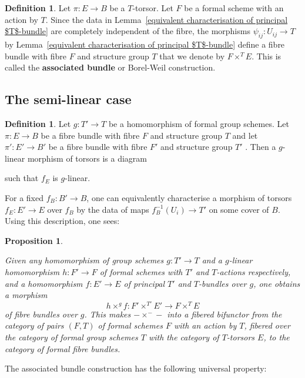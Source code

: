 \documentclass[10pt,oneside]{amsart}
\newtheorem{proposition}[theorem]{Proposition}
\theoremstyle{definition}
\newtheorem{definition}[theorem]{Definition}
\begin{document}
	\begin{definition} \label{definition of Borel construction}
		Let $\pi\colon E\rightarrow B$ be a $T$-torsor. Let $F$ be a formal scheme with an action by $T$. Since the data in Lemma~\ref{equivalent characterisation of principal $T$-bundle} are completely independent of the fibre, the morphisms $\psi_{ij}\colon U_{ij}\rightarrow T$ by Lemma~\ref{equivalent characterisation of principal $T$-bundle} define a fibre bundle with fibre $F$ and structure group $T$ that we denote by $F\times^T E$. This is called the \textbf{associated bundle} or Borel-Weil construction.
	\end{definition}
	\subsection{The semi-linear case}
	\begin{definition}
		Let $g\colon T'\rightarrow T$ be a homomorphism of formal group schemes. Let $\pi\colon E\rightarrow B$ be a fibre bundle with fibre $F$ and structure group $T$ and let $\pi'\colon E'\rightarrow B'$ be a fibre bundle with fibre $F'$ and structure group $T'$ . Then a $g$-linear morphism of torsors is a diagram
		\begin{center}
		\end{center}		
		such that $f_E$ is $g$-linear.
	\end{definition}
	For a fixed $f_B\colon B'\rightarrow B$, one can equivalently characterise a morphism of torsors $f_E\colon E'\to E$ over $f_B$ by the data of maps $f_B^{-1}(U_i)\to T'$ on some cover of $B$. Using this description, one sees:
	\begin{proposition}\label{associated bundle construction in the semi-linear case is a sort of fibered bifunctor}
		
		Given any homomorphism of group schemes $g\colon T'\rightarrow T$ and a $g$-linear homomorphism $h\colon F'\rightarrow F$ of formal schemes with $T'$ and $T$-actions respectively, and a homomorphism $f\colon E'\rightarrow E$ of principal $T'$ and $T$-bundles over $g$, one obtains a morphism
		\[h\times^g f \colon F'\times^{T'}E'\rightarrow F\times^T E\]
		of fibre bundles over $g$. This makes $-\times^{-}-$ into a fibered bifunctor from the category of pairs $(F,T)$ of formal schemes $F$ with an action by $T$, fibered over the category of formal group schemes $T$ with the category of $T$-torsors $E$, to the category of formal fibre bundles.
	\end{proposition}
	The associated bundle construction has the following universal property:
	
\end{document}
